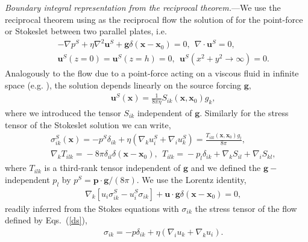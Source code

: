 {\it Boundary integral representation from the reciprocal theorem.}---We use the reciprocal theorem \cite{hb,ps} using as the reciprocal flow the solution of \cite{LironMochon} for the point-force or Stokeslet between two parallel plates, i.e.\
\begin{eqnarray}&&
-\nabla p^S+\eta \nabla^2 \bm u^S+\bm g\delta(\bm x-\bm x_0)=0,\ \ \nabla\cdot\bm u^S=0, \label{stokes}\\&& \bm u^S(z=0)=\bm u^S(z=h)=0,\ \ \bm u^S(x^2+y^2\to\infty)=0.\nonumber \end{eqnarray}
Analogously to the flow due to a point-force acting on a viscous fluid in infinite space (e.g. \cite{ps}), the solution depends linearly on the source forcing $\bm g$,
\begin{eqnarray}&&\!\!\!\!\!\!\!\!\!\!
\bm u^S(\bm x)=\frac{1}{8\pi \eta}S_{ik}(\bm x, \bm x_0)g_k, \label{vl}
\end{eqnarray}
where we introduced the tensor $S_{ik}$ independent of $\bm g$. Similarly for the stress tensor of the Stokeslet solution we can write,
\begin{eqnarray}&&
\sigma^S_{ik}(\bm x)\!=-p^S\delta_{ik}+\eta\left(\nabla_k u^S_i+\nabla_i u^S_k\right)\!=\!\frac{T_{ilk}(\bm x, \bm x_0)g_l}{8\pi},\label{st}\\&& \nabla_kT_{ilk}\!=\!-8\pi\delta_{il}\delta(\bm x\!-\!\bm x_0),\ \ T_{ilk}\!\!=\!\!-p_l \delta_{ik}\!+\!\nabla_k S_{il}\!+\!\nabla_i S_{kl},\nonumber
\end{eqnarray}
where $T_{ilk}$ is a third-rank tensor independent of $\bm g$ and we defined the $\bm g-$independent $p_l$ by $p^S=\bm p\cdot\bm g/(8\pi)$.
We use the Lorentz identity,
\begin{eqnarray}&&
\nabla_k\left[u_{i}\sigma^S_{ik}-u^S_i\sigma_{ik}\right]+\bm u\cdot \bm g\delta(\bm x-\bm x_0)=0,\label{lo}
\end{eqnarray}
readily inferred from the Stokes equations with $\sigma_{ik}$ the stress tensor of the flow defined by Eqs.~(\ref{ds}),
\begin{eqnarray}&&
\sigma_{ik}=-p\delta_{ik}+\eta\left(\nabla_iu_k+\nabla_ku_i\right).
\end{eqnarray}
